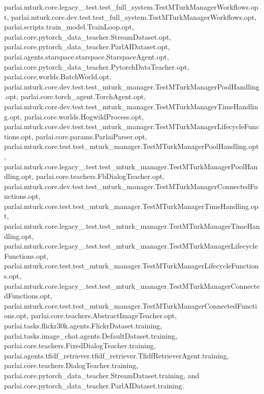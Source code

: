parlai.\+mturk.\+core.\+legacy\+\_.\+test.\+test\+\_\+full\+\_\+system.\+Test\+M\+Turk\+Manager\+Workflows.\+opt, parlai.\+mturk.\+core.\+dev.\+test.\+test\+\_\+full\+\_\+system.\+Test\+M\+Turk\+Manager\+Workflows.\+opt, parlai.\+scripts.\+train\+\_\+model.\+Train\+Loop.\+opt, parlai.\+core.\+pytorch\+\_\+data\+\_\+teacher.\+Stream\+Dataset.\+opt, parlai.\+core.\+pytorch\+\_\+data\+\_\+teacher.\+Parl\+A\+I\+Dataset.\+opt, parlai.\+agents.\+starspace.\+starspace.\+Starspace\+Agent.\+opt, parlai.\+core.\+pytorch\+\_\+data\+\_\+teacher.\+Pytorch\+Data\+Teacher.\+opt, parlai.\+core.\+worlds.\+Batch\+World.\+opt, parlai.\+mturk.\+core.\+dev.\+test.\+test\+\_\+mturk\+\_\+manager.\+Test\+M\+Turk\+Manager\+Pool\+Handling.\+opt, parlai.\+core.\+torch\+\_\+agent.\+Torch\+Agent.\+opt, parlai.\+mturk.\+core.\+dev.\+test.\+test\+\_\+mturk\+\_\+manager.\+Test\+M\+Turk\+Manager\+Time\+Handling.\+opt, parlai.\+core.\+worlds.\+Hogwild\+Process.\+opt, parlai.\+mturk.\+core.\+dev.\+test.\+test\+\_\+mturk\+\_\+manager.\+Test\+M\+Turk\+Manager\+Lifecycle\+Functions.\+opt, parlai.\+core.\+params.\+Parlai\+Parser.\+opt, parlai.\+mturk.\+core.\+test.\+test\+\_\+mturk\+\_\+manager.\+Test\+M\+Turk\+Manager\+Pool\+Handling.\+opt, parlai.\+mturk.\+core.\+legacy\+\_.\+test.\+test\+\_\+mturk\+\_\+manager.\+Test\+M\+Turk\+Manager\+Pool\+Handling.\+opt, parlai.\+core.\+teachers.\+Fb\+Dialog\+Teacher.\+opt, parlai.\+mturk.\+core.\+dev.\+test.\+test\+\_\+mturk\+\_\+manager.\+Test\+M\+Turk\+Manager\+Connected\+Functions.\+opt, parlai.\+mturk.\+core.\+test.\+test\+\_\+mturk\+\_\+manager.\+Test\+M\+Turk\+Manager\+Time\+Handling.\+opt, parlai.\+mturk.\+core.\+legacy\+\_.\+test.\+test\+\_\+mturk\+\_\+manager.\+Test\+M\+Turk\+Manager\+Time\+Handling.\+opt, parlai.\+mturk.\+core.\+legacy\+\_.\+test.\+test\+\_\+mturk\+\_\+manager.\+Test\+M\+Turk\+Manager\+Lifecycle\+Functions.\+opt, parlai.\+mturk.\+core.\+test.\+test\+\_\+mturk\+\_\+manager.\+Test\+M\+Turk\+Manager\+Lifecycle\+Functions.\+opt, parlai.\+mturk.\+core.\+legacy\+\_.\+test.\+test\+\_\+mturk\+\_\+manager.\+Test\+M\+Turk\+Manager\+Connected\+Functions.\+opt, parlai.\+mturk.\+core.\+test.\+test\+\_\+mturk\+\_\+manager.\+Test\+M\+Turk\+Manager\+Connected\+Functions.\+opt, parlai.\+core.\+teachers.\+Abstract\+Image\+Teacher.\+opt, parlai.\+tasks.\+flickr30k.\+agents.\+Flickr\+Dataset.\+training, parlai.\+tasks.\+image\+\_\+chat.\+agents.\+Default\+Dataset.\+training, parlai.\+core.\+teachers.\+Fixed\+Dialog\+Teacher.\+training, parlai.\+agents.\+tfidf\+\_\+retriever.\+tfidf\+\_\+retriever.\+Tfidf\+Retriever\+Agent.\+training, parlai.\+core.\+teachers.\+Dialog\+Teacher.\+training, parlai.\+core.\+pytorch\+\_\+data\+\_\+teacher.\+Stream\+Dataset.\+training, and parlai.\+core.\+pytorch\+\_\+data\+\_\+teacher.\+Parl\+A\+I\+Dataset.\+training.

